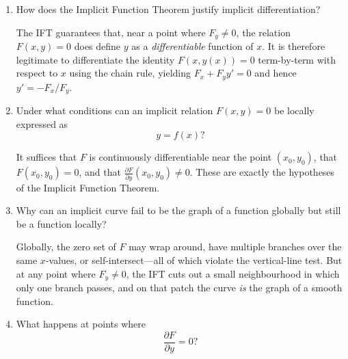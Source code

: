 \documentclass{essay}
\begin{document}
\begin{enumerate}[leftmargin=*, itemsep=8pt]
    \begin{answer}
      Let $F:\R^2\to\R$ be continuously differentiable
      near $(x_0,y_0)$ with $F(x_0,y_0)=0$ and $\frac{\partial
      F}{\partial y}(x_0,y_0)\neq 0$. Then there exist an open interval
      $U\ni x_0$ and a unique continuously differentiable function $f :
      U \to \R$ such that $f(x_0)=y_0$ and \[ F(x,f(x))=0 \quad
      \text{for all} x\in U. \] Moreover, $f'(x)=-F_x(x,f(x))/F_y(x,f(x))$.
    \end{answer}

  \item How does the Implicit Function Theorem justify implicit differentiation?

    \begin{answer} The IFT guarantees that, near a point where
      $F_y\neq 0$, the relation $F(x,y)=0$ does define $y$ as a
      \emph{differentiable} function of $x$.  It is therefore
      legitimate to differentiate the identity $F(x,y(x))=0$
      term-by-term with respect to $x$ using the chain rule, yielding
      $F_x + F_y y'=0$ and hence $y'=-F_x/F_y$.
    \end{answer}

  \item Under what conditions can an implicit relation $F(x,y)=0$ be
    locally expressed as \[ y=f(x)? \]

    \begin{answer} It suffices that $F$ is continuously
      differentiable near the point $(x_0,y_0)$, that $F(x_0,y_0)=0$,
      and that $\frac{\partial F}{\partial y}(x_0,y_0)\neq 0$.  These
      are exactly the hypotheses of the Implicit Function Theorem.
    \end{answer}

  \item Why can an implicit curve fail to be the graph of a function
    globally but still be a function locally?

    \begin{answer} Globally, the zero set of $F$ may wrap around,
      have multiple branches over the same $x$-values, or
      self-intersect---all of which violate the vertical-line test.
      But at any point where $F_y\neq 0$, the IFT cuts out a small
      neighbourhood in which only one branch passes, and on that patch
      the curve \emph{is} the graph of a smooth function.
    \end{answer}

  \item What happens at points where \[ \frac{\partial F}{\partial y}=0? \]


\end{enumerate}
\end{document}
